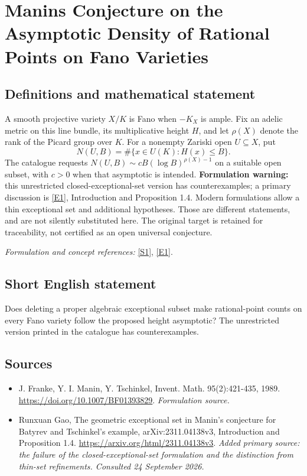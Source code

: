 \documentclass[11pt]{article}
\begin{document}
\section*{\texorpdfstring{Manins Conjecture on the Asymptotic Density of Rational Points on Fano Varieties}{Manins Conjecture on the Asymptotic Density of Rational Points on Fano Varieties}}\label{statement}
\subsection{Definitions and mathematical statement}
A smooth projective variety $X/K$ is Fano when $-K_X$ is ample. Fix an adelic metric on this line bundle, its multiplicative height $H$, and let $\rho(X)$ denote the rank of the Picard group over $K$. For a nonempty Zariski open $U\subseteq X$, put
\[
 N(U,B)=\#\{x\in U(K):H(x)\le B\}.
\]
The catalogue requests $N(U,B)\sim cB(\log B)^{\rho(X)-1}$ on a suitable open subset, with $c>0$ when that asymptotic is intended. \textbf{Formulation warning:} this unrestricted closed-exceptional-set version has counterexamples; a primary discussion is \href{https://arxiv.org/html/2311.04138v3}{[E1]}, Introduction and Proposition 1.4. Modern formulations allow a thin exceptional set and additional hypotheses. Those are different statements, and are not silently substituted here. The original target is retained for traceability, not certified as an open universal conjecture.
\par\smallskip\textit{Formulation and concept references:} \href{https://doi.org/10.1007/BF01393829}{[S1]}, \href{https://arxiv.org/html/2311.04138v3}{[E1]}.

\subsection{Short English statement}
Does deleting a proper algebraic exceptional subset make rational-point counts on every Fano variety follow the proposed height asymptotic? The unrestricted version printed in the catalogue has counterexamples.
\subsection{Sources}
\begin{itemize}
\item[S1]J. Franke, Y. I. Manin, Y. Tschinkel, Invent. Math. 95(2):421-435, 1989.
\url{https://doi.org/10.1007/BF01393829}.
\textit{Formulation source.}
\item[E1]Runxuan Gao, The geometric exceptional set in Manin's conjecture for Batyrev and Tschinkel's example, arXiv:2311.04138v3, Introduction and Proposition 1.4.
\url{https://arxiv.org/html/2311.04138v3}.
\textit{Added primary source: the failure of the closed-exceptional-set formulation and the distinction from thin-set refinements. Consulted 24 September 2026.}
\end{itemize}
\end{document}
